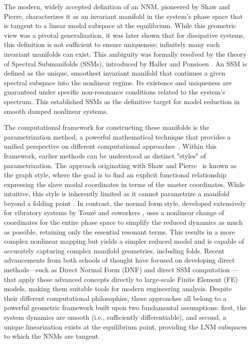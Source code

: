 \documentclass[a4paper,9pt,parskip=half,english]{article}
\theoremstyle{plain}
\theoremstyle{definition}
\begin{document}
The modern, widely accepted definition of an NNM, pioneered by Shaw and Pierre, characterizes it as an invariant manifold in the system's phase space that is tangent to a linear modal subspace at the equilibrium. While this geometric view was a pivotal generalization, it was later shown that for dissipative systems, this definition is not sufficient to ensure uniqueness; infinitely many such invariant manifolds can exist. This ambiguity was formally resolved by the theory of Spectral Submanifolds (SSMs), introduced by Haller and Ponsioen \cite{Haller2016, Ponsioen2020}. An SSM is defined as the unique, smoothest invariant manifold that continues a given spectral subspace into the nonlinear regime. Its existence and uniqueness are guaranteed under specific non-resonance conditions related to the system's spectrum. This established SSMs as the definitive target for model reduction in smooth damped nonlinear systems.

The computational framework for constructing these manifolds is the parametrization method, a powerful mathematical technique that provides a unified perspective on different computational approaches~\cite{Haro2016}. Within this framework, earlier methods can be understood as distinct "styles" of parametrization. The approach originating with Shaw and Pierre~\cite{Shaw1993} is known as the graph style, where the goal is to find an explicit functional relationship expressing the slave modal coordinates in terms of the master coordinates. While intuitive, this style is inherently limited as it cannot parametrize a manifold beyond a folding point \cite{Touze2021}. In contrast, the normal form style, developed extensively for vibratory systems by Touzé and coworkers \cite{Touze2003a, Touze2004,Touze2014}, uses a nonlinear change of coordinates for the entire phase space to simplify the reduced dynamics as much as possible, retaining only the essential resonant terms. This results in a more complex nonlinear mapping but yields a simpler reduced model and is capable of accurately capturing complex manifold geometries, including folds. Recent advancements from both schools of thought have focused on developing direct methods—such as Direct Normal Form (DNF) \cite{Vizzaccaro2021,Opreni2021} and direct SSM computation \cite{Jain2021,Veraszto2020}—that apply these advanced concepts directly to large-scale Finite Element (FE) models, making them suitable tools for modern engineering analysis. Despite their different computational philosophies, these approaches all belong to a powerful geometric framework built upon two fundamental assumptions: first, the system dynamics are smooth (i.e., sufficiently differentiable), and second, a unique linearization exists at the equilibrium point, providing the LNM subspaces to which the NNMs are tangent.
\end{document}
